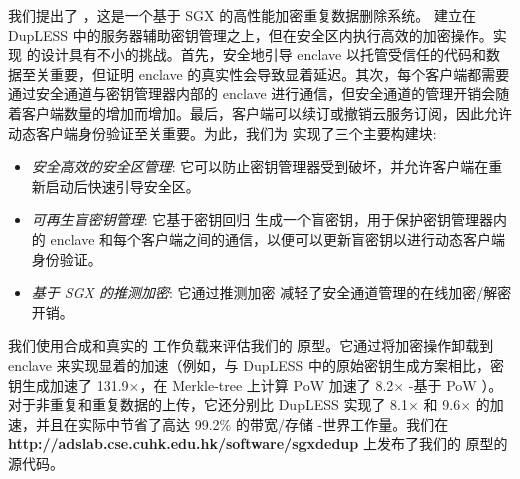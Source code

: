 我们提出了 \sysname，这是一个基于 SGX 的高性能加密重复数据删除系统。 \sysname 建立在 DupLESS \cite{bellare13b} 中的服务器辅助密钥管理之上，但在安全区内执行高效的加密操作。实现 \sysname 的设计具有不小的挑战。首先，安全地引导 enclave 以托管受信任的代码和数据至关重要，但证明 enclave 的真实性会导致显着延迟。其次，每个客户端都需要通过安全通道与密钥管理器内部的 enclave 进行通信，但安全通道的管理开销会随着客户端数量的增加而增加。最后，客户端可以续订或撤销云服务订阅，因此允许动态客户端身份验证至关重要。为此，我们为 \sysname 实现了三个主要构建块: 

\begin{itemize}[leftmargin=*]
    \item \textit{ 安全高效的安全区管理}:
        它可以防止密钥管理器受到破坏，并允许客户端在重新启动后快速引导安全区。
    \item \textit{ 可再生盲密钥管理}:
        它基于密钥回归 \cite{fu06} 生成一个盲密钥，用于保护密钥管理器内的 enclave 和每个客户端之间的通信，以便可以更新盲密钥以进行动态客户端身份验证。
    \item \textit{ 基于 SGX 的推测加密}:
        它通过推测加密 \cite{eduardo19} 减轻了安全通道管理的在线加密/解密开销。
\end{itemize}

我们使用合成和真实的 \cite{fsl,meyer11} 工作负载来评估我们的 \sysname 原型。它通过将加密操作卸载到 enclave 来实现显着的加速（例如，与 DupLESS \cite{bellare13b} 中的原始密钥生成方案相比，密钥生成加速了 131.9$\times$，在 Merkle-tree 上计算 PoW 加速了 8.2$\times$ -基于 PoW \cite{halevi11}）。对于非重复和重复数据的上传，它还分别比 DupLESS \cite{bellare13b} 实现了 8.1$\times$ 和 9.6$\times$ 的加速，并且在实际中节省了高达 99.2\% 的带宽/存储 -世界工作量。我们在 {\bf http://adslab.cse.cuhk.edu.hk/software/sgxdedup} 上发布了我们的 \sysname 原型的源代码。 

